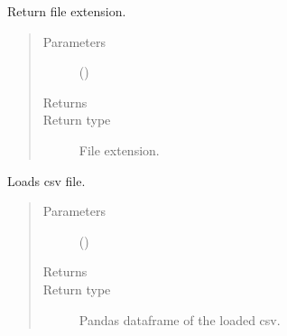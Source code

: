 \documentclass[letterpaper,10pt,english]{sphinxmanual}
\begin{document}

\begin{fulllineitems}
\label{\detokenize{source/optimization.opt_tools:optimization.opt_tools.load_data.get_file_extension}}
Return file extension.
\begin{quote}\begin{description}
\item[{Parameters}] \leavevmode
\sphinxstyleliteralstrong{\sphinxupquote{(}}\sphinxstyleliteralstrong{\sphinxupquote{)}} () \textendash{} 

\item[{Returns}] \leavevmode


\item[{Return type}] \leavevmode
File extension.

\end{description}\end{quote}

\end{fulllineitems}


\begin{fulllineitems}
\label{\detokenize{source/optimization.opt_tools:optimization.opt_tools.load_data.load_csv}}
Loads csv file.
\begin{quote}\begin{description}
\item[{Parameters}] \leavevmode
\sphinxstyleliteralstrong{\sphinxupquote{(}}\sphinxstyleliteralstrong{\sphinxupquote{)}} () \textendash{} 

\item[{Returns}] \leavevmode
{}

\item[{Return type}] \leavevmode
Pandas dataframe of the loaded csv.

\end{description}\end{quote}

\end{fulllineitems}
\end{document}
